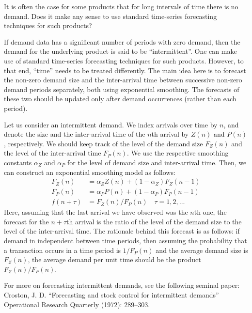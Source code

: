 \begin{question}
It is often the case for some products that for long intervals of time there is no demand. Does it make any sense to use standard time-series forecasting techniques for such products?

  \begin{solution}
  If demand data has a significant number of periods with zero demand, then the demand for the underlying product is said to be ``intermittent''. One can make use of standard time-series forecasting techniques for such products. However, to that end, ``time'' needs to be treated differently. The main idea here is to forecast the non-zero demand size and the inter-arrival time between successive non-zero demand periods separately, both using exponential smoothing. The forecasts of these two should be updated only after demand occurrences (rather than each period). 
  
  Let us consider an intermittent demand. We index arrivals over time by $n$, and denote the size and the inter-arrival time of the $n$th arrival by $Z(n)$ and $P(n)$, respectively. We should keep track of the level of the demand size $F_Z(n)$ and the level of the inter-arrival time $F_P(n)$. We use the respective smoothing constants $\alpha_Z$ and $\alpha_P$ for the level of demand size and inter-arrival time. Then, we can construct an exponential smoothing model as follows:
\begin{align*}
F_Z(n) & = \alpha_Z Z(n) + (1-\alpha_Z) F_Z(n-1) \\
F_P(n) & = \alpha_P P(n) + (1-\alpha_P) F_P(n-1) \\
f(n+\tau) & = F_Z(n)/F_P(n) \quad \tau = 1,2,\ldots
\end{align*}   
   Here, assuming that the last arrival we have observed was the $n$th one, the forecast for the $n+\tau$th arrival is the ratio of the level of the demand size to the level of the inter-arrival time. The rationale behind this forecast is as follows: if demand in independent between time periods, then assuming the probability that a transaction occurs in a time period is $1/F_P(n)$ and the average demand size is $F_Z(n)$, the average demand per unit time should be the product $F_Z(n)/F_P(n)$.
   
For more on forecasting intermittent demands, see the following seminal paper: Croston, J. D. ``Forecasting and stock control for intermittent demands'' Operational Research Quarterly (1972): 289--303.   
  \end{solution}
\end{question}

